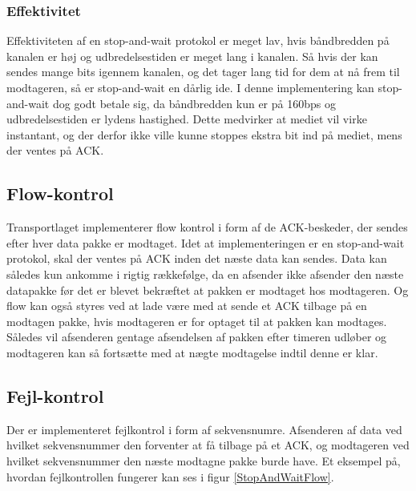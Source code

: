 \subsubsection{Effektivitet}
Effektiviteten af en stop-and-wait protokol er meget lav, hvis båndbredden på kanalen er høj og udbredelsestiden er meget lang i kanalen. Så hvis der kan sendes mange bits igennem kanalen, og det tager lang tid for dem at nå frem til modtageren, så er stop-and-wait en dårlig ide. I denne implementering kan stop-and-wait dog godt betale sig, da båndbredden kun er på 160bps og udbredelsestiden er lydens hastighed. Dette medvirker at mediet vil virke instantant, og der derfor ikke ville kunne stoppes ekstra bit ind på mediet, mens der ventes på ACK.

\subsection{Flow-kontrol}
Transportlaget implementerer flow kontrol i form af de ACK-beskeder, der sendes efter hver data pakke er modtaget. Idet at implementeringen er en stop-and-wait protokol, skal der ventes på ACK inden det næste data kan sendes. Data kan således kun ankomme i rigtig rækkefølge, da en afsender ikke afsender den næste datapakke før det er blevet bekræftet at pakken er modtaget hos modtageren. Og flow kan også styres ved at lade være med at sende et ACK tilbage på en modtagen pakke, hvis modtageren er for optaget til at pakken kan modtages. Således vil afsenderen gentage afsendelsen af pakken efter timeren udløber og modtageren kan så fortsætte med at nægte modtagelse indtil denne er klar.

\subsection{Fejl-kontrol}
Der er implementeret fejlkontrol i form af sekvensnumre. Afsenderen af data ved hvilket sekvensnummer den forventer at få tilbage på et ACK, og modtageren ved hvilket sekvensnummer den næste modtagne pakke burde have. Et eksempel på, hvordan fejlkontrollen fungerer kan ses i figur \ref{StopAndWaitFlow}.

